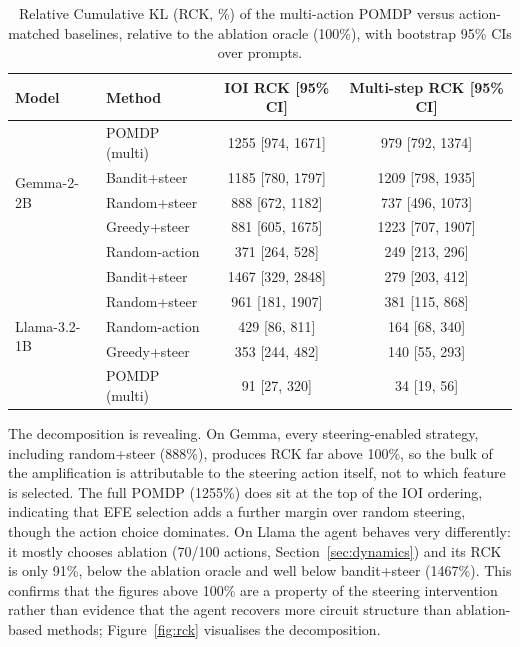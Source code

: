 \begin{table}[H]
\centering
\caption{Relative Cumulative KL (RCK, \%) of the multi-action POMDP
versus action-matched baselines, relative to the ablation oracle (100\%),
with bootstrap 95\% CIs over prompts.}
\label{tab:rck}
{\small
\begin{tabular}{llcc}
\toprule
\textbf{Model} & \textbf{Method} & \textbf{IOI RCK [95\% CI]} & \textbf{Multi-step RCK [95\% CI]} \\
\midrule
\multirow{5}{*}{Gemma-2-2B}
 & POMDP (multi) & 1255 [974, 1671] & 979 [792, 1374] \\
 & Bandit+steer  & 1185 [780, 1797] & 1209 [798, 1935] \\
 & Random+steer  & 888 [672, 1182]  & 737 [496, 1073] \\
 & Greedy+steer  & 881 [605, 1675]  & 1223 [707, 1907] \\
 & Random-action & 371 [264, 528]   & 249 [213, 296] \\
\midrule
\multirow{5}{*}{Llama-3.2-1B}
 & Bandit+steer  & 1467 [329, 2848] & 279 [203, 412] \\
 & Random+steer  & 961 [181, 1907]  & 381 [115, 868] \\
 & Random-action & 429 [86, 811]    & 164 [68, 340] \\
 & Greedy+steer  & 353 [244, 482]   & 140 [55, 293] \\
 & POMDP (multi) & 91 [27, 320]     & 34 [19, 56] \\
\bottomrule
\end{tabular}
}
\end{table}

The decomposition is revealing.  On Gemma, every steering-enabled
strategy, including random+steer (888\%), produces RCK far above
100\%, so the bulk of the amplification is attributable to the
steering action itself, not to which feature is selected.  The full
POMDP (1255\%) does sit at the top of the IOI ordering, indicating
that EFE selection adds a further margin over random steering, though the
action choice dominates.  On Llama the agent behaves very differently:
it mostly chooses ablation (70/100 actions, Section~\ref{sec:dynamics})
and its RCK is only 91\%, below the ablation oracle and well below
bandit+steer (1467\%).  This confirms that the figures above 100\% are a
property of the steering intervention rather than evidence that the
agent recovers more circuit structure than ablation-based methods; 
Figure~\ref{fig:rck} visualises the decomposition.

